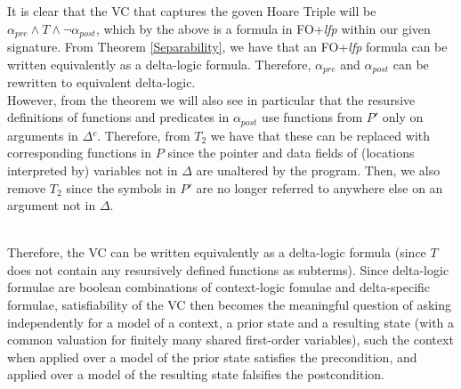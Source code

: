 It is clear that the VC that captures the goven Hoare Triple will be $\alpha_{\textit{pre}} \land{} T \land{} \neg{} \alpha_{\textit{post}}$, which by the above is a formula in FO+\textit{lfp} within our given signature. From Theorem \ref{Separability}, we have that an FO+\textit{lfp} formula can be written equivalently as a delta-logic formula. Therefore, $\alpha_{\textit{pre}}$ and $\alpha_{\textit{post}}$ can be rewritten to equivalent delta-logic.\\
However, from the theorem we will also see in particular that the resursive definitions of functions and predicates in $\alpha_{\textit{post}}$ use functions from $P'$ only on arguments in $\Delta{}^{c}$. Therefore, from $T_2$ we have that these can be replaced with corresponding functions in $P$ since the pointer and data fields of (locations interpreted by) variables not in $\Delta{}$ are unaltered by the program. Then, we also remove $T_2$ since the symbols in $P'$ are no longer referred to anywhere else on an argument not in $\Delta{}$.\\\

Therefore, the VC can be written equivalently as a delta-logic formula (since $T$ does not contain any resursively defined functions as subterms). Since delta-logic formulae are boolean combinations of context-logic fomulae and delta-specific formulae, satisfiability of the VC then becomes the meaningful question of asking independently for a model of a context, a prior state and a resulting state (with a common valuation for finitely many shared first-order variables), such the context when applied over a model of the prior state satisfies the precondition, and applied over a model of the resulting state falsifies the postcondition. 